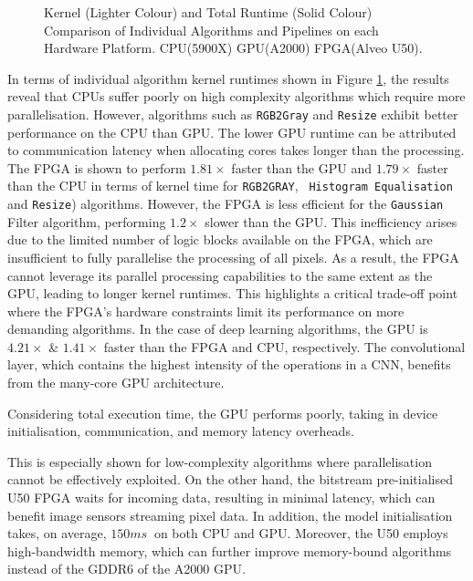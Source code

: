 \documentclass[]{spie}  %
\begin{document}
\begin{figure}
    \centering
\resizebox{0.7\linewidth}{!}{}    %
    \caption[SIFT Power Consumption]{Kernel (Lighter Colour) and Total Runtime (Solid Colour) Comparison of Individual Algorithms and Pipelines on each Hardware Platform. CPU(5900X) GPU(A2000) FPGA(Alveo U50).}
    \label{fig:IndividualRuntime}
\end{figure}

In terms of individual algorithm kernel runtimes shown in Figure \ref{fig:IndividualRuntime}, the results reveal that CPUs suffer poorly on high complexity algorithms which require more parallelisation. However, algorithms such as \texttt{RGB2Gray} and \texttt{Resize} exhibit better performance on the CPU than GPU. The lower GPU runtime can be attributed to communication latency when allocating cores takes longer than the processing. The FPGA is shown to perform $1.81\times$ faster than the GPU and $1.79\times$ faster than the CPU in terms of kernel time for \texttt{RGB2GRAY}, \texttt{ Histogram Equalisation} and \texttt{Resize}) algorithms. However, the FPGA is less efficient for the \texttt{Gaussian} Filter algorithm, performing $1.2\times$ slower than the GPU. This inefficiency arises due to the limited number of logic blocks available on the FPGA, which are insufficient to fully parallelise the processing of all pixels. As a result, the FPGA cannot leverage its parallel processing capabilities to the same extent as the GPU, leading to longer kernel runtimes. This highlights a critical trade-off point where the FPGA's hardware constraints limit its performance on more demanding algorithms. In the case of deep learning algorithms, the GPU is $4.21\times$ \& $1.41\times$ faster than the FPGA and CPU, respectively. The convolutional layer, which contains the highest intensity of the operations in a CNN, benefits from the many-core GPU architecture. 

Considering total execution time, the GPU performs poorly, taking in device initialisation, communication, and memory latency overheads. 

This is especially shown for low-complexity algorithms where parallelisation cannot be effectively exploited. On the other hand, the bitstream pre-initialised U50 FPGA waits for incoming data, resulting in minimal latency, which can benefit image sensors streaming pixel data. In addition, the model initialisation takes, on average, $150ms~$ on both CPU and GPU. Moreover, the U50 employs high-bandwidth memory, which can further improve memory-bound algorithms instead of the GDDR6 of the A2000 GPU. 
\end{document}
